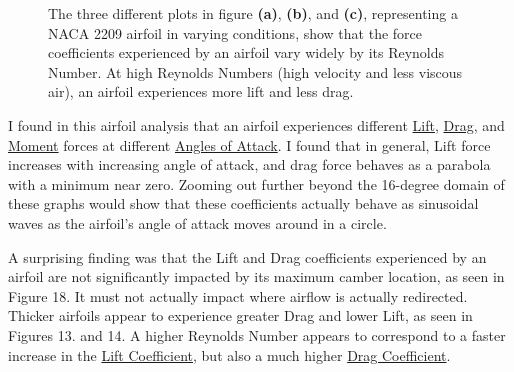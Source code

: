 \documentclass{article}
\begin{document}
\begin{figure}[!htb]
  \centering
  \caption{The three different plots in figure \textbf{(a)}, \textbf{(b)}, and \textbf{(c)}, representing a NACA 2209 airfoil in varying conditions, show that the force coefficients experienced by an airfoil vary widely by its Reynolds Number. At high Reynolds Numbers (high velocity and less viscous air), an airfoil experiences more lift and less drag.}
  \label{fig:8}
\end{figure}

I found in this airfoil analysis that an airfoil experiences different \hyperlink{CL}{Lift}, \hyperlink{CL}{Drag}, and \hyperlink{CM}{Moment} forces at different \hyperlink{alpha}{Angles of Attack}. I found that in general, Lift force increases with increasing angle of attack, and drag force behaves as a parabola with a minimum near zero. Zooming out further beyond the 16-degree domain of these graphs would show that these coefficients actually behave as sinusoidal waves as the airfoil's angle of attack moves around in a circle.\newline

A surprising finding was that the Lift and Drag coefficients experienced by an airfoil are not significantly impacted by its maximum camber location, as seen in Figure 18. It must not actually impact where airflow is actually redirected. Thicker airfoils appear to experience greater Drag and lower Lift, as seen in Figures 13. and 14. A higher Reynolds Number appears to correspond to a faster increase in the \hyperlink{CL}{Lift Coefficient}, but also a much higher \hyperlink{CD}{Drag Coefficient}. \newline
\end{document}
